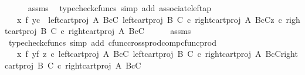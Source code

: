 \begin{isabellebody}
\ \ \ \ \isamarkupfalse%
\ assms\ \isamarkupfalse%
\ {\isacharparenleft}{\kern0pt}typecheck{\isacharunderscore}{\kern0pt}cfuncs{\isacharcomma}{\kern0pt}\ simp\ add{\isacharcolon}{\kern0pt}\ associate{\isacharunderscore}{\kern0pt}left{\isacharunderscore}{\kern0pt}ap{\isacharparenright}{\kern0pt}\isanewline
\ \ \isamarkupfalse%
\ \isamarkupfalse%
\ {\isachardoublequoteopen}{\isachardot}{\kern0pt}{\isachardot}{\kern0pt}{\isachardot}{\kern0pt}\ {\isacharequal}{\kern0pt}\ {\isasymlangle}{\isacharparenleft}{\kern0pt}x\ {\isasymtimes}\isactrlsub f\ y{\isacharparenright}{\kern0pt}{\isasymcirc}\isactrlsub c\ {\isasymlangle}\ left{\isacharunderscore}{\kern0pt}cart{\isacharunderscore}{\kern0pt}proj\ A\ {\isacharparenleft}{\kern0pt}B{\isasymtimes}\isactrlsub cC{\isacharparenright}{\kern0pt}{\isacharcomma}{\kern0pt}\ left{\isacharunderscore}{\kern0pt}cart{\isacharunderscore}{\kern0pt}proj\ B\ C\ {\isasymcirc}\isactrlsub c\ right{\isacharunderscore}{\kern0pt}cart{\isacharunderscore}{\kern0pt}proj\ A\ {\isacharparenleft}{\kern0pt}B{\isasymtimes}\isactrlsub cC{\isacharparenright}{\kern0pt}{\isasymrangle}{\isacharcomma}{\kern0pt}z\ {\isasymcirc}\isactrlsub c\ right{\isacharunderscore}{\kern0pt}cart{\isacharunderscore}{\kern0pt}proj\ B\ C\ {\isasymcirc}\isactrlsub c\ right{\isacharunderscore}{\kern0pt}cart{\isacharunderscore}{\kern0pt}proj\ A\ {\isacharparenleft}{\kern0pt}B{\isasymtimes}\isactrlsub cC{\isacharparenright}{\kern0pt}{\isasymrangle}{\isachardoublequoteclose}\isanewline
\ \ \ \ \isamarkupfalse%
\ assms\ \isamarkupfalse%
\ {\isacharparenleft}{\kern0pt}typecheck{\isacharunderscore}{\kern0pt}cfuncs{\isacharcomma}{\kern0pt}\ simp\ add{\isacharcolon}{\kern0pt}\ cfunc{\isacharunderscore}{\kern0pt}cross{\isacharunderscore}{\kern0pt}prod{\isacharunderscore}{\kern0pt}comp{\isacharunderscore}{\kern0pt}cfunc{\isacharunderscore}{\kern0pt}prod{\isacharparenright}{\kern0pt}\isanewline
\ \ \isamarkupfalse%
\ \isamarkupfalse%
\ {\isachardoublequoteopen}{\isachardot}{\kern0pt}{\isachardot}{\kern0pt}{\isachardot}{\kern0pt}\ {\isacharequal}{\kern0pt}\ {\isacharparenleft}{\kern0pt}{\isacharparenleft}{\kern0pt}x\ {\isasymtimes}\isactrlsub f\ y{\isacharparenright}{\kern0pt}{\isasymtimes}\isactrlsub f\ z{\isacharparenright}{\kern0pt}\ {\isasymcirc}\isactrlsub c\ {\isasymlangle}{\isasymlangle}left{\isacharunderscore}{\kern0pt}cart{\isacharunderscore}{\kern0pt}proj\ A\ {\isacharparenleft}{\kern0pt}B{\isasymtimes}\isactrlsub cC{\isacharparenright}{\kern0pt}{\isacharcomma}{\kern0pt}\ left{\isacharunderscore}{\kern0pt}cart{\isacharunderscore}{\kern0pt}proj\ B\ C\ {\isasymcirc}\isactrlsub c\ right{\isacharunderscore}{\kern0pt}cart{\isacharunderscore}{\kern0pt}proj\ A\ {\isacharparenleft}{\kern0pt}B{\isasymtimes}\isactrlsub cC{\isacharparenright}{\kern0pt}{\isasymrangle}{\isacharcomma}{\kern0pt}right{\isacharunderscore}{\kern0pt}cart{\isacharunderscore}{\kern0pt}proj\ B\ C\ {\isasymcirc}\isactrlsub c\ right{\isacharunderscore}{\kern0pt}cart{\isacharunderscore}{\kern0pt}proj\ A\ {\isacharparenleft}{\kern0pt}B{\isasymtimes}\isactrlsub cC{\isacharparenright}{\kern0pt}{\isasymrangle}{\isachardoublequoteclose}\isanewline

\end{isabellebody}
